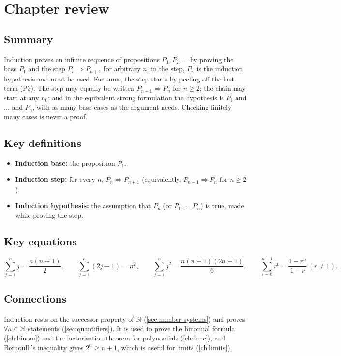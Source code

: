 \section{Chapter review}
\subsection*{Summary}
Induction proves an infinite sequence of propositions $P_1,P_2,\dots$ by proving the base $P_1$ and the step
$P_n\Rightarrow P_{n+1}$ for arbitrary $n$; in the step, $P_n$ is the induction hypothesis and must be used. For sums, the
step starts by peeling off the last term (P3). The step may equally be written $P_{n-1}\Rightarrow P_n$ for $n\ge2$; the
chain may start at any $n_0$; and in the equivalent strong formulation the hypothesis is $P_1$ and $\dots$ and $P_n$, with
as many base cases as the argument needs. Checking finitely many cases is never a proof.

\subsection*{Key definitions}
\begin{itemize}
  \item \textbf{Induction base:} the proposition $P_1$.
  \item \textbf{Induction step:} for every $n$, $P_n\Rightarrow P_{n+1}$ (equivalently, $P_{n-1}\Rightarrow P_n$ for $n\ge2$).
  \item \textbf{Induction hypothesis:} the assumption that $P_n$ (or $P_1,\dots,P_n$) is true, made while proving the step.
\end{itemize}

\subsection*{Key equations}
\[
\sum_{j=1}^{n}j=\frac{n(n+1)}2,\qquad\sum_{j=1}^{n}(2j-1)=n^2,\qquad\sum_{j=1}^{n}j^2=\frac{n(n+1)(2n+1)}6,\qquad
\sum_{t=0}^{n-1}r^t=\frac{1-r^n}{1-r}\ (r\ne1).
\]

\subsection*{Connections}
Induction rests on the successor property of $\mathbb{N}$ (\cref{sec:number-systems}) and proves $\forall n\in\mathbb{N}$ statements
(\cref{sec:quantifiers}). It is used to prove the binomial formula (\cref{ch:binom}) and the factorisation theorem for
polynomials (\cref{ch:func}), and Bernoulli's inequality gives $2^n\ge n+1$, which is useful for limits
(\cref{ch:limits}).

